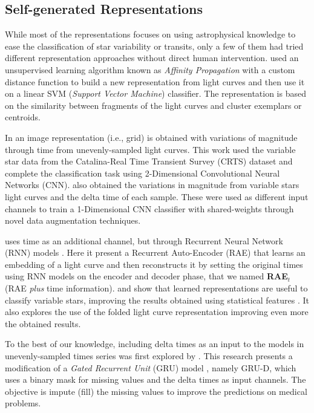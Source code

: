 \subsection{Self-generated Representations}

While most of the representations focuses on using astrophysical knowledge to ease the classification of star variability or transits, only a few of them had tried different representation approaches without direct human intervention.
\citep{mackenzie2016clustering} used an unsupervised learning algorithm known as \textit{Affinity Propagation} 
with a custom distance function to build a new representation from light curves and then use it on a linear SVM (\textit{Support Vector Machine}) classifier. The representation is based on the similarity between fragments of the light curves and cluster exemplars or centroids.

In \citep{mahabal2017deep} an image representation (i.e., grid) is obtained with variations of magnitude through time from unevenly-sampled light curves. This work used the variable star data from the Catalina-Real Time Transient Survey (CRTS) dataset and complete the classification task using 2-Dimensional Convolutional Neural Networks (CNN).
\citep{aguirre2019deep} also obtained the variations in magnitude from variable stars light curves and the delta time of each sample. These were used as different input channels to train a 1-Dimensional CNN classifier with shared-weights through novel data augmentation techniques.

\citep{naul2018recurrent} uses time as an additional channel, but through Recurrent Neural Network (RNN) models \citep{lipton2015critical}. Here it present a Recurrent Auto-Encoder (RAE) that learns an embedding of a light curve and then reconstructs it by setting the original times using RNN models on the encoder and decoder phase, that we named \textbf{RAE$_t$} (RAE \textit{plus} time information). \citep{naul2018recurrent} and \citep{tsang2019deep} show that learned representations are useful to classify variable stars, improving the results obtained using statistical features \citep{richards2011machine}. It also explores the use of the folded light curve representation improving even more the obtained results.

To the best of our knowledge, including delta times as an input to the models in unevenly-sampled times series was first explored by \citep{che2018recurrent}. This research presents a modification of a \textit{Gated Recurrent Unit} (GRU) model \citep{cho2014properties}, namely GRU-D, which uses a binary mask for missing values and the delta times as input channels. The objective is impute (fill) the missing values to improve the predictions on medical problems.


